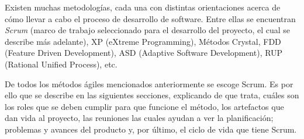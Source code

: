 Existen muchas metodologías, cada una con distintas orientaciones acerca de cómo llevar a cabo el proceso de desarrollo de software. Entre ellas se encuentran \emph{Scrum} (marco de trabajo seleccionado para el desarrollo del proyecto, el cual se describe más adelante), XP (eXtreme Programming), Métodos Crystal, FDD (Feature Driven Development), ASD (Adaptive Software Development), RUP (Rational Unified Process), etc.

De todos los métodos ágiles mencionados anteriormente se escoge Scrum. Es por ello que se describe en las siguientes secciones, explicando de que trata, cuáles son los roles que se deben cumplir para que funcione el método, los artefactos que dan vida al proyecto, las reuniones las cuales ayudan a ver la planificación; problemas y avances del producto y, por último, el ciclo de vida que tiene Scrum.